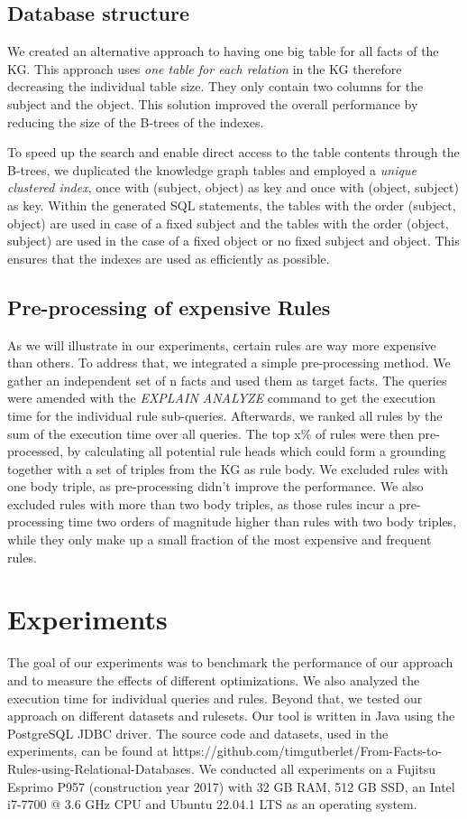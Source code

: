 \documentclass[english]{lni}
\begin{document}
\subsection{Database structure}
We created an alternative approach to having one big table for all facts of the KG. This approach uses \textit{one table for each relation} in the KG therefore decreasing the individual table size. They only contain two columns for the subject and the object. This solution improved the overall performance by reducing the size of the B-trees of the indexes.

To speed up the search and enable direct access to the table contents through the B-trees, we duplicated the knowledge graph tables and employed a \textit{unique clustered index}, once with (subject, object) as key and once with (object, subject) as key. Within the generated SQL statements, the tables with the order (subject, object) are used in case of a fixed subject and the tables with the order (object, subject) are used in the case of a fixed object or no fixed subject and object. This ensures that the indexes are used as efficiently as possible.

\subsection{Pre-processing of expensive Rules}
As we will illustrate in our experiments, certain rules are way more expensive than others. To address that, we integrated a simple pre-processing method. We gather an independent set of n facts and used them as target facts. The queries were amended with the \textit{EXPLAIN ANALYZE} command to get the execution time for the individual rule sub-queries. Afterwards, we ranked all rules by the sum of the execution time over all queries. The top x\% of rules were then pre-processed, by calculating all potential rule heads which could form a grounding together with a set of triples from the KG as rule body. We excluded rules with one body triple, as pre-processing didn’t improve the performance. We also excluded rules with more than two body triples, as those rules incur a pre-processing time two orders of magnitude higher than rules with two body triples, while they only make up a small fraction of the most expensive and frequent rules.


\section{Experiments}
The goal of our experiments was to benchmark the performance of our approach and to measure the effects of different optimizations. We also analyzed the execution time for individual queries and rules. Beyond that, we tested our approach on different datasets and rulesets. Our tool is written in Java using the PostgreSQL JDBC driver. The source code and datasets, used in the experiments, can be found at https://github.com/timgutberlet/From-Facts-to-Rules-using-Relational-Databases. We conducted all experiments on a Fujitsu Esprimo P957 (construction year 2017) with 32 GB RAM, 512 GB SSD, an Intel i7-7700 @ 3.6 GHz CPU and Ubuntu 22.04.1 LTS as an operating system.
\end{document}
